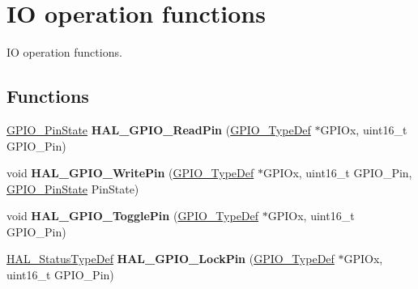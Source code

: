 \hypertarget{group___g_p_i_o___exported___functions___group2}{\section{I\-O operation functions}
\label{group___g_p_i_o___exported___functions___group2}
}


I\-O operation functions.  


\subsection*{Functions}
\begin{DoxyCompactItemize}
\item 
\hypertarget{group___g_p_i_o___exported___functions___group2_gaf2b819ea6551319ddd5670db318d2e4e}{\hyperlink{group___g_p_i_o___exported___types_ga5b3ef0486b179415581eb342e0ea6b43}{G\-P\-I\-O\-\_\-\-Pin\-State} {\bfseries H\-A\-L\-\_\-\-G\-P\-I\-O\-\_\-\-Read\-Pin} (\hyperlink{struct_g_p_i_o___type_def}{G\-P\-I\-O\-\_\-\-Type\-Def} $\ast$G\-P\-I\-Ox, uint16\-\_\-t G\-P\-I\-O\-\_\-\-Pin)}\label{group___g_p_i_o___exported___functions___group2_gaf2b819ea6551319ddd5670db318d2e4e}

\item 
\hypertarget{group___g_p_i_o___exported___functions___group2_gaf4b97bdf533a02f51ef696d43b6da5c4}{void {\bfseries H\-A\-L\-\_\-\-G\-P\-I\-O\-\_\-\-Write\-Pin} (\hyperlink{struct_g_p_i_o___type_def}{G\-P\-I\-O\-\_\-\-Type\-Def} $\ast$G\-P\-I\-Ox, uint16\-\_\-t G\-P\-I\-O\-\_\-\-Pin, \hyperlink{group___g_p_i_o___exported___types_ga5b3ef0486b179415581eb342e0ea6b43}{G\-P\-I\-O\-\_\-\-Pin\-State} Pin\-State)}\label{group___g_p_i_o___exported___functions___group2_gaf4b97bdf533a02f51ef696d43b6da5c4}

\item 
\hypertarget{group___g_p_i_o___exported___functions___group2_gaf5e0c89f752de5cdedcc30db068133f6}{void {\bfseries H\-A\-L\-\_\-\-G\-P\-I\-O\-\_\-\-Toggle\-Pin} (\hyperlink{struct_g_p_i_o___type_def}{G\-P\-I\-O\-\_\-\-Type\-Def} $\ast$G\-P\-I\-Ox, uint16\-\_\-t G\-P\-I\-O\-\_\-\-Pin)}\label{group___g_p_i_o___exported___functions___group2_gaf5e0c89f752de5cdedcc30db068133f6}

\item 
\hypertarget{group___g_p_i_o___exported___functions___group2_gad03c868b4a4fb25883c1bb86d0c7e9ca}{\hyperlink{stm32l1xx__hal__def_8h_a63c0679d1cb8b8c684fbb0632743478f}{H\-A\-L\-\_\-\-Status\-Type\-Def} {\bfseries H\-A\-L\-\_\-\-G\-P\-I\-O\-\_\-\-Lock\-Pin} (\hyperlink{struct_g_p_i_o___type_def}{G\-P\-I\-O\-\_\-\-Type\-Def} $\ast$G\-P\-I\-Ox, uint16\-\_\-t G\-P\-I\-O\-\_\-\-Pin)}\label{group___g_p_i_o___exported___functions___group2_gad03c868b4a4fb25883c1bb86d0c7e9ca}


\end{DoxyCompactItemize}
